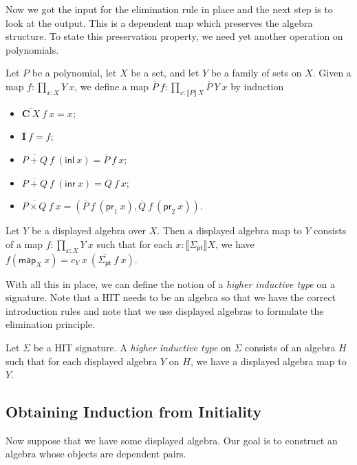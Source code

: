 \documentclass[9pt]{entcs}
\newcommand{\term}[1]{\mathsf{#1}}
\newcommand{\constructor}[1]{\mathbf{#1}}
\newcommand{\function}[1]{\mathsf{#1}}
\newcommand{\deprod}[3]{\prod_{#1 : #2} #3} %
\newcommand{\0}{\textbf{0}} %
\newcommand{\1}{\textbf{1}} %
\newcommand{\inl}{\term{inl}} %
\newcommand{\inr}{\term{inr}} %
\newcommand{\prl}{\term{pr}_1} %
\newcommand{\prr}{\term{pr}_2} %
\newcommand{\C}{\constructor{C}} %
\newcommand{\I}{\constructor{I}} %
\newcommand{\sumP}[2]{#1 + #2} %
\newcommand{\prodP}[2]{#1 \times #2} %
\newcommand{\pt}[0]{\textsf{pt}}
\newcommand{\pointc}[1]{#1_{\pt}} %
\newcommand{\semP}[1]{\llbracket #1 \rrbracket} %
\newcommand{\constrA}[1]{\function{map}_{#1}} %
\newcommand{\polydact}[2]{\overline{#1} \> #2}
\newcommand{\polydmap}[2]{\overline{#1} \> #2}
\begin{document}
Now we got the input for the elimination rule in place and the next step is to look at the output.
This is a dependent map which preserves the algebra structure.
To state this preservation property, we need yet another operation on polynomials.

\begin{definition}
Let $P$ be a polynomial, let $X$ be a set, and let $Y$ be a family of sets on $X$.
Given a map $f : \deprod{x}{X}{Y \> x}$, we define a map $\polydmap{P}{f} : \deprod{x}{\semP{P} \> X}{\polydact{P}{Y} \> x}$ by induction
\begin{itemize}
	\item $\polydmap{\C \> X}{f} \> x = x$;
	\item $\polydmap{\I}{f} = f$;
	\item $\polydmap{\sumP{P}{Q}}{f} \> (\inl \> x) = \polydmap{P}{f} \> x$;
	\item $\polydmap{\sumP{P}{Q}}{f} \> (\inr \> x) = \polydmap{Q}{f} \> x$;
	\item $\polydmap{\prodP{P}{Q}}{f} \> x = (\polydact{P}{f} \> (\prl \> x) , \polydact{Q}{f} \> (\prr \> x))$.
\end{itemize}
\end{definition}

\begin{definition}
Let $Y$ be a displayed algebra over $X$.
Then a displayed algebra map to $Y$ consists of a map $f : \deprod{x}{X}{Y \> x}$ such that for each $x : \semP{\pointc{\Sigma}}{X}$, we have $f(\constrA{X} \> x) = c_Y \> x \> (\polydmap{\pointc{\Sigma}}{f} \> x)$.
\end{definition}

With all this in place, we can define the notion of a \emph{higher inductive type} on a signature.
Note that a HIT needs to be an algebra so that we have the correct introduction rules and note that we use displayed algebras to formulate the elimination principle.

\begin{definition}
Let $\Sigma$ be a HIT signature.
A \emph{higher inductive type} on $\Sigma$ consists of an algebra $H$ such that for each displayed algebra $Y$ on $H$, we have a displayed algebra map to $Y$.
\end{definition}

\subsection{Obtaining Induction from Initiality}
Now suppose that we have some displayed algebra.
Our goal is to construct an algebra whose objects are dependent pairs.
\end{document}
